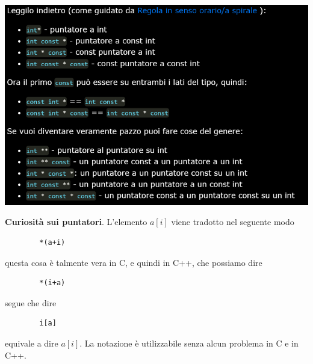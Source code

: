 \begin{center}
	\includegraphics[scale=0.80]{img/155.PNG}
\end{center} 

\begin{framed}\noindent \textbf{Curiosità sui puntatori}. L'elemento $a[i]$ viene tradotto nel seguente modo
	\begin{verbatim}
		*(a+i)
	\end{verbatim}
	questa cosa è talmente vera in C, e quindi in C++, che possiamo dire
	\begin{verbatim}
		*(i+a)
	\end{verbatim}
	segue che dire
	\begin{verbatim}
		i[a]
	\end{verbatim}
	equivale a dire $a[i]$. La notazione è utilizzabile senza alcun problema in C e in C++.\end{framed}
